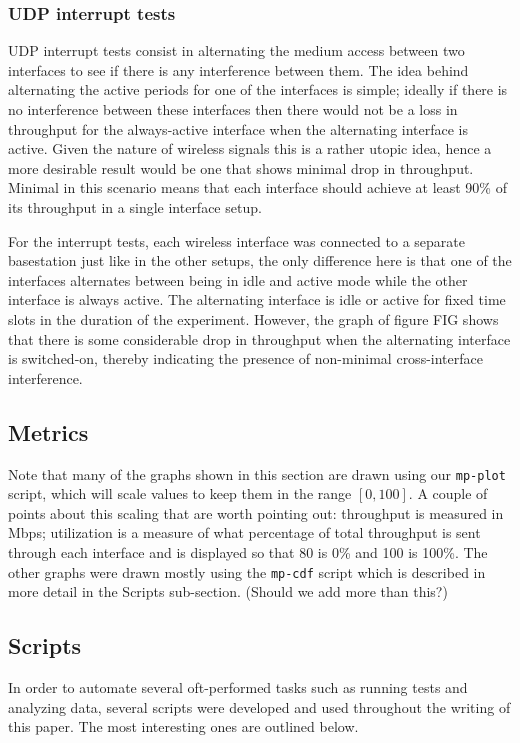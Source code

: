 \subsubsection{UDP interrupt tests}
UDP interrupt tests consist in alternating the medium access between two 
interfaces to see if there is any interference between them.
The idea behind alternating the active periods for one of the interfaces is
simple; ideally if there is no interference between these interfaces then there
would not be a loss in throughput for the always-active interface when the
alternating interface is active. Given the nature of wireless signals this is a
rather utopic idea, hence a more desirable result would be one that shows
minimal drop in throughput. Minimal in this scenario means that each interface
should achieve at least 90\% of its throughput in a single interface setup.

For the interrupt tests, each wireless interface was connected to a separate
basestation just like in the other setups, the only difference here is that one
of the interfaces alternates between being in idle and active mode while the
other interface is always active. The alternating interface is idle or active
for fixed time slots in the duration of the experiment.
However, the graph of figure FIG shows that there is some considerable drop in  %
throughput when the alternating interface is switched-on, thereby indicating the
presence of non-minimal cross-interface interference.

\subsection{Metrics}
Note that many of the graphs shown in this section are drawn using our
\texttt{mp-plot} script, which will scale values to keep them in the range
$[0,100]$. A couple of points about this scaling that are worth pointing out:
throughput is measured in Mbps; utilization is a measure of what percentage of
total throughput is sent through each interface and is displayed so that 80 is
0\% and 100 is 100\%. The other graphs were drawn mostly using the 
\texttt{mp-cdf} script which is described in more detail in the Scripts 
sub-section. (Should we add more than this?)

\subsection{Scripts}
In order to automate several oft-performed tasks such as running tests and
analyzing data, several scripts were developed and used throughout the writing
of this paper. The most interesting ones are outlined below.


